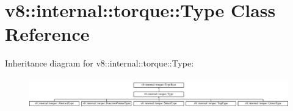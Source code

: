 \hypertarget{classv8_1_1internal_1_1torque_1_1Type}{}\section{v8\+:\+:internal\+:\+:torque\+:\+:Type Class Reference}
\label{classv8_1_1internal_1_1torque_1_1Type}
Inheritance diagram for v8\+:\+:internal\+:\+:torque\+:\+:Type\+:\begin{figure}[H]
\begin{center}
\leavevmode
\includegraphics[height=1.365854cm]{classv8_1_1internal_1_1torque_1_1Type}
\end{center}
\end{figure}
